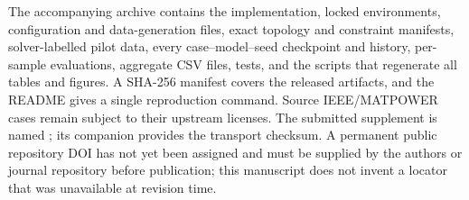 \documentclass[final,5p,times,twocolumn]{elsarticle}
\begin{document}
The accompanying archive contains the implementation, locked environments,
configuration and data-generation files, exact topology and constraint
manifests, solver-labelled pilot data, every case--model--seed checkpoint and
history, per-sample evaluations, aggregate CSV files, tests, and the scripts
that regenerate all tables and figures. A SHA-256 manifest covers the released
artifacts, and the README gives a single reproduction command. Source
IEEE/MATPOWER cases remain subject to their upstream licenses. The submitted
supplement is named
; its companion
 provides
the transport checksum. A permanent public
repository DOI has not yet been assigned and must be supplied by the authors
or journal repository before publication; this manuscript does not invent a
locator that was unavailable at revision time.



\end{document}

